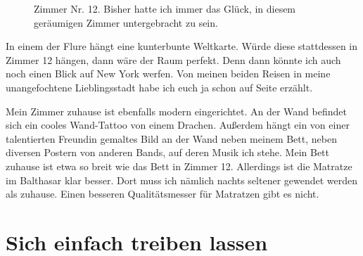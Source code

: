 \documentclass[fontsize=14pt,a4paper,headinclude,DIV=calc,automark]{scrbook}
\begin{document}
\setlength{\fboxsep}{0pt}    %
\setlength{\fboxrule}{0.2pt} %
\begin{figure}[ht]
    \raggedright
    \caption{Zimmer Nr. 12. Bisher hatte ich immer das Glück, in diesem geräumigen Zimmer untergebracht zu sein.}
    \label{fig:zimmer_12}
\end{figure}

In einem der Flure hängt eine kunterbunte Weltkarte. Würde diese stattdessen in Zimmer 12 hängen, dann wäre der Raum perfekt. Denn dann könnte ich auch noch einen Blick auf New York werfen. Von meinen beiden Reisen in meine unangefochtene Lieblingsstadt habe ich euch ja schon auf Seite \pageref{sec:new_york} erzählt.

Mein Zimmer zuhause ist ebenfalls modern eingerichtet. An der Wand befindet sich ein cooles Wand-Tattoo von einem Drachen. Außerdem hängt ein von einer talentierten Freundin gemaltes Bild an der Wand neben meinem Bett, neben diversen Postern von anderen Bands, auf deren Musik ich stehe. Mein Bett zuhause ist etwa so breit wie das Bett in Zimmer 12. Allerdings ist die Matratze im Balthasar klar besser. Dort muss ich nämlich nachts seltener gewendet werden als zuhause. Einen besseren Qualitätsmesser für Matratzen gibt es nicht.

\section{Sich einfach treiben lassen}
\end{document}
